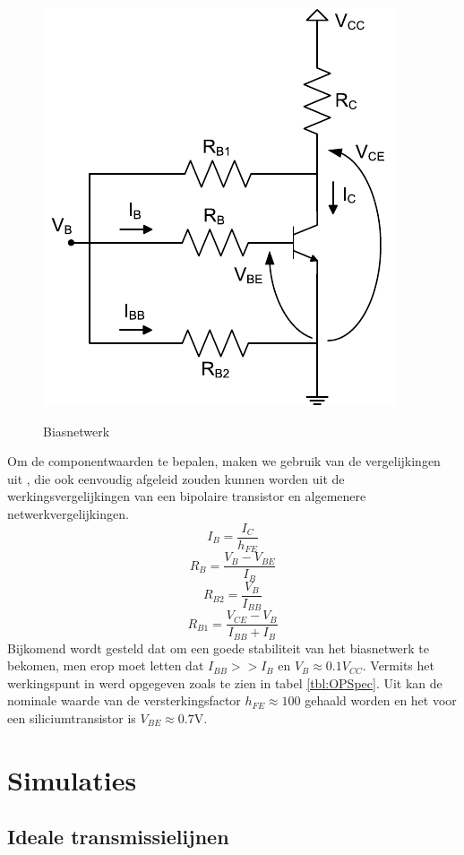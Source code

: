   \begin{figure}
    \centering
    \includegraphics[keepaspectratio=true]{fig/DCBias.pdf}
    \label{fig:DCBias}
    \caption{Biasnetwerk}
  \end{figure}

  Om de componentwaarden te bepalen, maken we gebruik van de vergelijkingen uit
  \cite{Gonzalez}, die ook eenvoudig afgeleid zouden kunnen worden uit de
  werkingsvergelijkingen van een bipolaire transistor en algemenere
  netwerkvergelijkingen.
    \[
      I_B = \frac{I_C}{h_{FE}}
    \]
    \[
      R_B = \frac{V_B - V_{BE}}{I_B}
    \]
    \[
      R_{B2} = \frac{V_B}{I_{BB}}
    \]
    \[
      R_{B1} = \frac{V_{CE} - V_B}{I_{BB} + I_B}
    \]
  Bijkomend wordt gesteld dat om een goede stabiliteit van het biasnetwerk te
  bekomen, men erop moet letten dat $I_{BB} >> I_B$ en $V_{B} \approx 0.1 V_{CC}$.
  Vermits het werkingspunt in \cite{lesWendy} werd opgegeven zoals te zien in
  tabel \ref{tbl:OPSpec}. Uit \cite{BFR91A} kan de nominale waarde van de
  versterkingsfactor $h_{FE} \approx 100$ gehaald worden en het voor een
  siliciumtransistor is $V_{BE} \approx 0.7 \mbox{V}$.

  

\section{Simulaties}
  \subsection{Ideale transmissielijnen}
